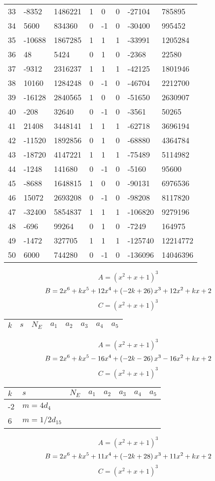 \documentclass{amsart}
\begin{document}
\begin{longtable}{|l|l|l|lllll|}
33&-8352&1486221&1&0&0&-27104&785895\\
34&5600&834360&0&-1&0&-30400&995452\\
35&-10688&1867285&1&1&1&-33991&1205284\\
36&48&5424&0&1&0&-2368&22580\\
37&-9312&2316237&1&1&1&-42125&1801946\\
38&10160&1284248&0&-1&0&-46704&2212700\\
39&-16128&2840565&1&0&0&-51650&2630907\\
40&-208&32640&0&-1&0&-3561&50265\\
41&21408&3448141&1&1&1&-62718&3696194\\
42&-11520&1892856&0&1&0&-68880&4364784\\
43&-18720&4147221&1&1&1&-75489&5114982\\
44&-1248&141680&0&-1&0&-5160&95600\\
45&-8688&1648815&1&0&0&-90131&6976536\\
46&15072&2693208&0&-1&0&-98208&8117820\\
47&-32400&5854837&1&1&1&-106820&9279196\\
48&-696&99264&0&1&0&-7249&164975\\
49&-1472&327705&1&1&1&-125740&12214772\\
50&6000&744280&0&-1&0&-136096&14046396\\
\hline
\end{longtable}
$$A=(x^2
 + x
 + 1)^{3}$$
$$B=2\*x^6
 + k\*x^5
 + 12\*x^4
 + \left(-2\*k
 + 26\right) \*x^3
 + 12\*x^2
 + k\*x
 + 2$$
$$C=(x^2
 + x
 + 1)^{3}$$
\begin{longtable}{|l|l|l|lllll|}
\hline
$k$ & $s$ & $N_E$ & $a_1$ & $a_2$ & $a_3$ & $a_4$ & $a_5$\\
\hline
\hline
\end{longtable}
$$A=(x^2
 + x
 + 1)^{3}$$
$$B=2\*x^6
 + k\*x^5
 - 16\*x^4
 + \left(-2\*k
 - 26\right) \*x^3
 - 16\*x^2
 + k\*x
 + 2$$
$$C=(x^2
 + x
 + 1)^{3}$$
\begin{longtable}{|l|l|l|lllll|}
\hline
$k$ & $s$ & $N_E$ & $a_1$ & $a_2$ & $a_3$ & $a_4$ & $a_5$\\
\hline
-2&$m=4d_{4}$&&\multicolumn{5}{c|}{}\\
6&$m=1/2d_{15}$&&\multicolumn{5}{c|}{}\\
\hline
\end{longtable}
$$A=(x^2
 + x
 + 1)^{3}$$
$$B=2\*x^6
 + k\*x^5
 + 11\*x^4
 + \left(-2\*k
 + 28\right) \*x^3
 + 11\*x^2
 + k\*x
 + 2$$
$$C=(x^2
 + x
 + 1)^{3}$$
\end{document}

